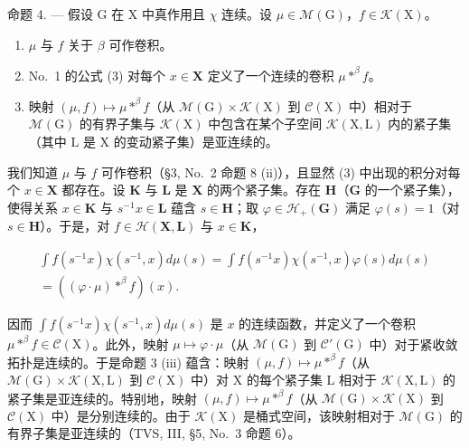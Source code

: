 命题 4. --- 假设 G 在 X 中真作用且 \(\chi\) 连续。设 \(\mu \in \mathcal{M}(\mathrm{G})\)，\(f \in \mathcal{K}(\mathrm{X})\)。

\begin{enumerate}
\def\labelenumi{(\roman{enumi})}
\item
  \(\mu\) 与 \(f\) 关于 \(\beta\) 可作卷积。
\item
  No.~1 的公式 (3) 对每个 \(x \in \mathbf{X}\) 定义了一个连续的卷积 \(\mu *^{\beta}f\)。
\item
  映射 \((\mu, f) \mapsto \mu *^{\beta}f\)（从 \(\mathcal{M}(\mathrm{G}) \times \mathcal{K}(\mathrm{X})\) 到 \(\mathcal{C}(\mathrm{X})\) 中）相对于 \(\mathcal{M}(\mathrm{G})\) 的有界子集与 \(\mathcal{K}(\mathrm{X})\) 中包含在某个子空间 \(\mathcal{K}(\mathrm{X}, \mathrm{L})\) 内的紧子集（其中 \(\mathrm{L}\) 是 \(\mathrm{X}\) 的变动紧子集）是亚连续的。
\end{enumerate}

我们知道 \(\mu\) 与 \(f\) 可作卷积（§3, No.~2 命题 8 (ii)），且显然 (3) 中出现的积分对每个 \(x \in \mathbf{X}\) 都存在。设 \(\mathbf{K}\) 与 \(\mathbf{L}\) 是 \(\mathbf{X}\) 的两个紧子集。存在 \(\mathbf{H}\)（\(\mathbf{G}\) 的一个紧子集），使得关系 \(x \in \mathbf{K}\) 与 \(s^{-1}x \in \mathbf{L}\) 蕴含 \(s \in \mathbf{H}\)；取 \(\varphi \in \mathcal{H}_{+}(\mathbf{G})\) 满足 \(\varphi(s) = 1\)（对 \(s \in \mathbf{H}\)）。于是，对 \(f \in \mathcal{H}(\mathbf{X}, \mathbf{L})\) 与 \(x \in \mathbf{K}\)，

\[
\begin{array}{c} \int f (s ^ {- 1} x) \chi (s ^ {- 1}, x) d \mu (s) = \int f (s ^ {- 1} x) \chi (s ^ {- 1}, x) \varphi (s) d \mu (s) \\ = ((\varphi \cdot \mu) * ^ {\beta} f) (x). \end{array}
\]

因而 \(\int f(s^{-1}x)\chi(s^{-1},x)d\mu(s)\) 是 \(x\) 的连续函数，并定义了一个卷积 \(\mu * ^ {\beta} f\in \mathcal{C}(\mathrm{X})\)。此外，映射 \(\mu \mapsto \varphi \cdot \mu\)（从 \(\mathcal{M}(\mathrm{G})\) 到 \(\mathcal{C}'(\mathrm{G})\) 中）对于紧收敛拓扑是连续的。于是命题 3 (iii) 蕴含：映射 \((\mu ,f)\mapsto \mu * ^ {\beta} f\)（从 \(\mathcal{M}(\mathrm{G})\times \mathcal{K}(\mathrm{X},\mathrm{L})\) 到 \(\mathcal{C}(\mathrm{X})\) 中）对 X 的每个紧子集 L 相对于 \(\mathcal{K}(\mathrm{X},\mathrm{L})\) 的紧子集是亚连续的。特别地，映射 \((\mu ,f)\mapsto \mu * ^ {\beta} f\)（从 \(\mathcal{M}(\mathrm{G})\times \mathcal{K}(\mathrm{X})\) 到 \(\mathcal{C}(\mathrm{X})\) 中）是分别连续的。由于 \(\mathcal{K}(\mathrm{X})\) 是桶式空间，该映射相对于 \(\mathcal{M}(\mathrm{G})\) 的有界子集是亚连续的（TVS, III, §5, No.~3 命题 6）。

